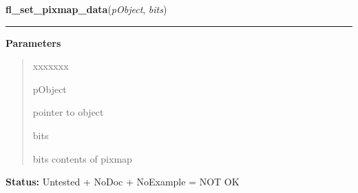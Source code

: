     \label{xformslib:library:fl_set_pixmap_data}

    \vspace{0.5ex}

\hspace{.8\funcindent}\begin{boxedminipage}{\funcwidth}

    \raggedright \textbf{fl\_set\_pixmap\_data}(\textit{pObject}, \textit{bits})

    \vspace{-1.5ex}

    \rule{\textwidth}{0.5\fboxrule}
\setlength{\parskip}{2ex}
\setlength{\parskip}{1ex}
      \textbf{Parameters}
      \vspace{-1ex}

      \begin{quote}
        \begin{Ventry}{xxxxxxx}

          \item[pObject]

          pointer to object

          \item[bits]

          bits contents of pixmap

        \end{Ventry}

      \end{quote}

\textbf{Status:} Untested + NoDoc + NoExample = NOT OK



    \end{boxedminipage}

    \label{xformslib:library:fl_set_pixmap_file}

    \vspace{0.5ex}

